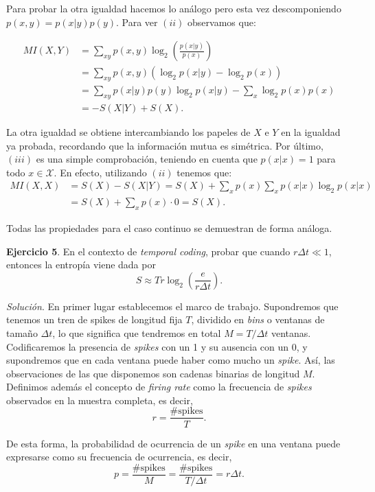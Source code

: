 \documentclass[11pt,a4paper]{article}
\begin{document}
Para probar la otra igualdad hacemos lo análogo pero esta vez descomponiendo $p(x,y)=p(x|y)p(y)$. Para ver $(ii)$ observamos que:

\begin{align*}
MI(X,Y) &= \sum_{xy}p(x,y)\log_2 \left( \frac{p(x|y)}{p(x)} \right)\\
&= \sum_{xy} p(x,y)(\log_2 p(x|y)-\log_2 p(x))\\
&= \sum_{xy} p(x|y)p(y)\log_2 p(x|y) - \sum_x \log_2 p(x)p(x)\\
&= -S(X|Y) + S(X).
\end{align*}

La otra igualdad se obtiene intercambiando los papeles de $X$ e $Y$ en la igualdad ya probada, recordando que la información mutua es simétrica. Por último, $(iii)$ es una simple comprobación, teniendo en cuenta que $p(x|x)=1$ para todo $x\in \mathcal X$. En efecto, utilizando $(ii)$ tenemos que:
\begin{align*}
MI(X,X) &= S(X) - S(X|Y) = S(X) + \sum_x p(x) \sum_x p(x|x)\log_2 p(x|x)\\
&= S(X) + \sum_x p(x)\cdot 0 = S(X).
\end{align*}

Todas las propiedades para el caso continuo se demuestran de forma análoga.
\vspace{1em}

\textbf{Ejercicio 5}. En el contexto de \textit{temporal coding}, probar que cuando $r\Delta t \ll 1$, entonces la entropía viene dada por
\[
S \approx Tr \log_2\left(\frac{e}{r\Delta t}\right).
\]

\textit{Solución}. En primer lugar establecemos el marco de trabajo. Supondremos que tenemos un tren de spikes de longitud fija $T$, dividido en \textit{bins} o ventanas de tamaño $\Delta t$, lo que significa que tendremos en total $M=T/\Delta t$ ventanas. Codificaremos la presencia de \textit{spikes} con un 1 y su ausencia con un 0, y supondremos que en cada ventana puede haber como mucho un \textit{spike}. Así, las observaciones de las que disponemos son cadenas binarias de longitud $M$.\\

Definimos además el concepto de \textit{firing rate} como la frecuencia de \textit{spikes} observados en la muestra completa, es decir,
\[
r= \frac{\#\text{spikes}}{T}.
\]

De esta forma, la probabilidad de ocurrencia de un \textit{spike} en una ventana puede expresarse como su frecuencia de ocurrencia, es decir,
\[
p = \frac{\#\text{spikes}}{M} = \frac{\#\text{spikes}}{T/\Delta t} = r\Delta t.
\]
\end{document}
